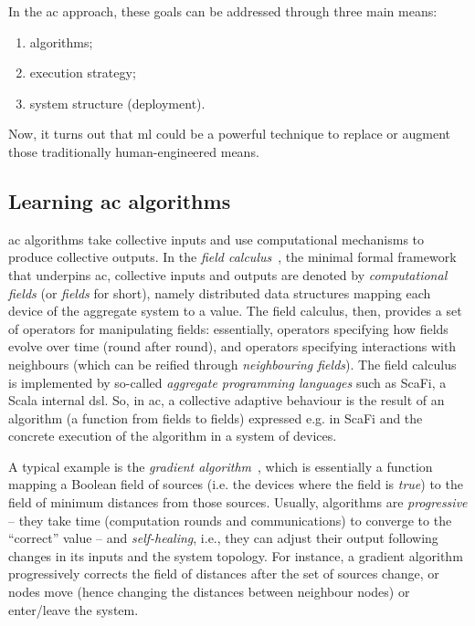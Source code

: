 In the \ac{ac} approach, 
 these goals can be addressed through three main means:
%
\begin{enumerate}
\item algorithms;
\item execution strategy;
\item system structure (deployment).
\end{enumerate}
%
Now, it turns out that \ac{ml}
 could be a powerful technique
 to replace
 or augment
 those traditionally human-engineered means.


\subsection{Learning \ac{ac} algorithms}

\ac{ac} algorithms 
 take collective inputs
 and use computational mechanisms
 to produce collective outputs.
%
In the \emph{field calculus}~\cite{DBLP:journals/jlap/ViroliBDACP19}, the minimal formal framework 
 that underpins \ac{ac},
 collective inputs and outputs are denoted by
 \emph{computational fields} (or \emph{fields} for short), namely
 distributed data structures 
 mapping each device of the aggregate system to a value.
%
The field calculus, then, provides a set of operators
 for manipulating fields:
 essentially, operators specifying how fields evolve over time (round after round),
 and operators specifying interactions with neighbours
 (which can be reified through \emph{neighbouring fields}).
%
%
The field calculus is implemented by so-called \emph{aggregate programming languages} such as ScaFi, a Scala internal \ac{dsl}.
%
So, in \ac{ac}, a collective adaptive behaviour
 is the result of an algorithm (a function from fields to fields) expressed e.g. in ScaFi
 and the concrete execution of the algorithm
 in a system of devices.
%

A typical example is the \emph{gradient algorithm}~\cite{DBLP:conf/saso/AudritoCDV17},
 which is essentially a function mapping a Boolean field of sources (i.e. the devices where the field is \emph{true})
 to the field of minimum distances from those sources.
%
Usually, algorithms are \emph{progressive} -- they take time (computation rounds and communications) to converge to the ``correct'' value --
and \emph{self-healing}, i.e., they can adjust their output following changes in its inputs and the system topology.
%
For instance, a gradient algorithm progressively corrects the field of distances after the set of sources change, or nodes move (hence changing the distances between neighbour nodes) or enter/leave the system.
%


